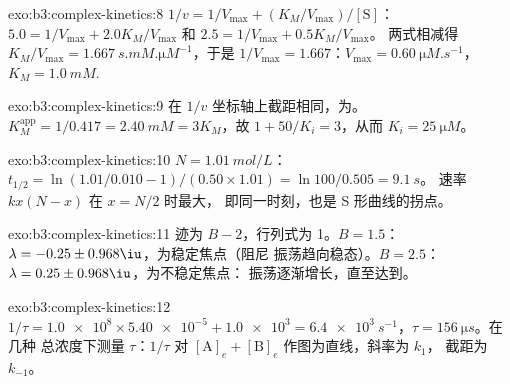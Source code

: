 \begin{solution}{exo:b3:complex-kinetics:8}
$1/v = 1/V_{\max} + (K_M/V_{\max})/[\mathrm S]$：$5.0 = 1/V_{\max} + 2.0K_M/V_{\max}$ 和 $2.5 = 1/V_{\max} + 0.5K_M/V_{\max}$。
两式相减得 $K_M/V_{\max} = \qty{1.667}{s.mM.\micro M^{-1}}$，于是 $1/V_{\max} = 1.667$：$V_{\max} = \qty{0.60}{\micro M.s^{-1}}$，
$K_M = \qty{1.0}{mM}$.
\end{solution}

\begin{solution}{exo:b3:complex-kinetics:9}
在 $1/v$ 坐标轴上截距相同，为。$K_M^{\mathrm{app}} = 1/0.417 = \qty{2.40}{mM} = 3K_M$，故
$1 + 50/K_i = 3$，从而 $K_i = \qty{25}{\micro M}$。
\end{solution}

\begin{solution}{exo:b3:complex-kinetics:10}
$N = \qty{1.01}{mol/L}$：$t_{1/2} = \ln(1.01/0.010 - 1)/(0.50 \times 1.01) = \ln100/0.505 = \qty{9.1}{s}$。
速率 $kx(N - x)$ 在 $x = N/2$ 时最大，
即同一时刻，也是 S 形曲线的拐点。
\end{solution}

\begin{solution}{exo:b3:complex-kinetics:11}
迹为 $B - 2$，行列式为 1。$B = 1.5$：$\lambda = -0.25 \pm 0.968\iu$，为稳定焦点（阻尼
振荡趋向稳态）。$B = 2.5$：$\lambda = 0.25 \pm 0.968\iu$，为不稳定焦点：
振荡逐渐增长，直至达到。
\end{solution}

\begin{solution}{exo:b3:complex-kinetics:12}
$1/\tau = \num{1.0e8} \times \num{5.40e-5} + \num{1.0e3} = \qty{6.4e3}{s^{-1}}$，$\tau = \qty{156}{\micro s}$。在几种
总浓度下测量 $\tau$：$1/\tau$ 对 $[\mathrm A]_e + [\mathrm B]_e$ 作图为直线，斜率为 $k_1$，
截距为 $k_{-1}$。
\end{solution}

